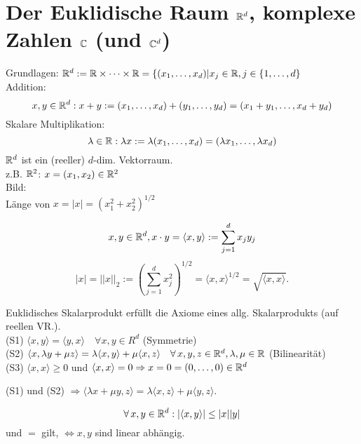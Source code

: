 \documentclass[../ana1.tex]{subfiles}
\begin{document}
\setcounter{section}{11}

\section{Der Euklidische Raum \( \mathbb{R}^d \), komplexe Zahlen \( \mathbb{C} \) (und \(\mathbb{C}^d \))}
Grundlagen: \( \mathbb{R}^d := \mathbb{R} \times \cdots \times \mathbb{R} = \{ (x_1, \dots, x_d) | x_j \in\mathbb{R}, j\in \{1,\dots, d \} \) \\
Addition:
\[x, y \in \mathbb{R}^d: x + y := (x_1, \dots , x_d) + (y_1, \dots, y_d) = (x_1 + y_1, \dots, x_d + y_d) \]
Skalare Multiplikation:
\[\lambda \in \mathbb{R}: \lambda x := \lambda(x_1, \dots , x_d) = (\lambda x_1, \dots, \lambda x_d) \]
\( \mathbb{R}^d \) ist ein (reeller) \(d\)-dim. Vektorraum.\\
z.B. \(\mathbb{R}^2\): \(x = (x_1, x_2) \in \mathbb{R}^2\) \\
Bild:\\%
Länge von \(x = |x| = {{(x_1^2 + x_2^2)}^{1/2}}\)
\begin{defi}
	\[ x,y \in\mathbb{R}^d, x\cdot y = \langle x,y\rangle := \sum_{j=1}^{d}x_j y_j \]
	\[ |x| = ||x||_2 := {(\sum_{j=1}^{d} x_j^2 )}^{1/2} = \langle x,x\rangle^{1/2} = \sqrt{\langle x,x\rangle}. \]
\end{defi}
\begin{bem}
	Euklidisches Skalarprodukt erfüllt die Axiome eines allg. Skalarprodukts (auf reellen VR.).\\
	(S1) \( \langle x,y\rangle = \langle y,x\rangle \quad\forall x,y\in R^d \) (Symmetrie)\\
	(S2) \( \langle x, \lambda y + \mu z\rangle = \lambda \langle x,y\rangle + \mu\langle x,z\rangle \quad \forall x,y,z\in\R^d, \lambda, \mu \in\R \) (Bilinearität)\\
	(S3) \( \langle x,x\rangle \geq 0 \) und \( \langle x,x\rangle = 0 \Rightarrow x=0 = (0,\dots,0) \in\mathbb{R}^d \)
\end{bem}
\begin{bem}
	(S1) und (S2) \( \Rightarrow \langle\lambda x + \mu y, z\rangle = \lambda  \langle x,z\rangle + \mu \langle y,z\rangle \).
\end{bem}
\begin{satz}
	\[ \forall x,y\in\R^d: |\langle x,y\rangle|\leq |x||y|\]
	und \glqq{}\(=\)\grqq{} gilt, \( \Leftrightarrow x,y \) sind linear abhängig.
\end{satz}
\end{document}
